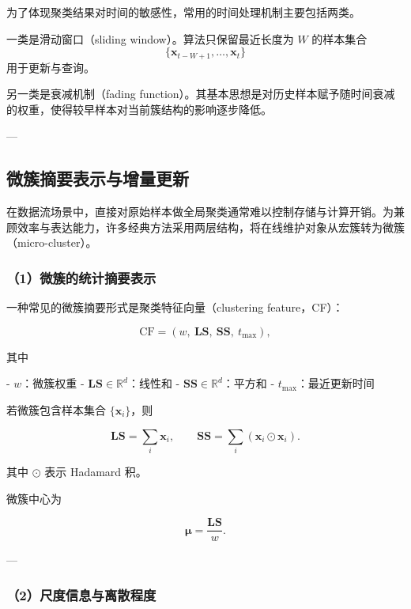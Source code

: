 \documentclass{xdupgthesis}
\begin{document}
为了体现聚类结果对时间的敏感性，常用的时间处理机制主要包括两类。

一类是滑动窗口（sliding window）。算法只保留最近长度为 $W$ 的样本集合
\[
\{\mathbf{x}_{t-W+1},\ldots,\mathbf{x}_t\}
\]
用于更新与查询。

另一类是衰减机制（fading function）。其基本思想是对历史样本赋予随时间衰减的权重，使得较早样本对当前簇结构的影响逐步降低。

---

\subsection{微簇摘要表示与增量更新}

在数据流场景中，直接对原始样本做全局聚类通常难以控制存储与计算开销。为兼顾效率与表达能力，许多经典方法采用两层结构，将在线维护对象从宏簇转为微簇（micro-cluster）。

\subsubsection{（1）微簇的统计摘要表示}

一种常见的微簇摘要形式是聚类特征向量（clustering feature，CF）：

\begin{equation}
	\mathrm{CF}
	=
	\left(
	w,\ \mathbf{LS},\ \mathbf{SS},\ t_{\max}
	\right),
\end{equation}

其中

- $w$：微簇权重  
- $\mathbf{LS}\in\mathbb{R}^d$：线性和  
- $\mathbf{SS}\in\mathbb{R}^d$：平方和  
- $t_{\max}$：最近更新时间  

若微簇包含样本集合 $\{\mathbf{x}_i\}$，则

\begin{equation}
	\mathbf{LS}=\sum_i \mathbf{x}_i,
	\qquad
	\mathbf{SS}=\sum_i (\mathbf{x}_i \odot \mathbf{x}_i).
\end{equation}

其中 $\odot$ 表示 Hadamard 积。

微簇中心为

\begin{equation}
	\boldsymbol{\mu}
	=
	\frac{\mathbf{LS}}{w}.
\end{equation}

---

\subsubsection{（2）尺度信息与离散程度}
\end{document}
